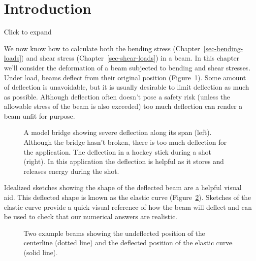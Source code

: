 \documentclass[
  letterpaper,
  DIV=11,
  numbers=noendperiod]{scrreprt}
\theoremstyle{definition}
\theoremstyle{remark}
\begin{document}
\section*{Introduction}\label{introduction-10}


Click to expand

We now know how to calculate both the bending stress
(Chapter~\ref{sec-bending-loads}) and shear stress
(Chapter~\ref{sec-shear-loads}) in a beam. In this chapter we'll
consider the deformation of a beam subjected to bending and shear
stresses. Under load, beams deflect from their original position
(Figure~\ref{fig-11.1}). Some amount of deflection is unavoidable, but
it is usually desirable to limit deflection as much as possible.
Although deflection often doesn't pose a safety risk (unless the
allowable stress of the beam is also exceeded) too much deflection can
render a beam unfit for purpose.

\begin{figure}


\caption{\label{fig-11.1}A model bridge showing severe deflection along
its span (left). Although the bridge hasn't broken, there is too much
deflection for the application. The deflection in a hockey stick during
a shot (right). In this application the deflection is helpful as it
stores and releases energy during the shot.}

\end{figure}%

Idealized sketches showing the shape of the deflected beam are a helpful
visual aid. This deflected shape is known as the elastic curve
(Figure~\ref{fig-11.2}). Sketches of the elastic curve provide a quick
visual reference of how the beam will deflect and can be used to check
that our numerical answers are realistic.

\begin{figure}


\caption{\label{fig-11.2}Two example beams showing the undeflected
position of the centerline (dotted line) and the deflected position of
the elastic curve (solid line).}

\end{figure}%
\end{document}

